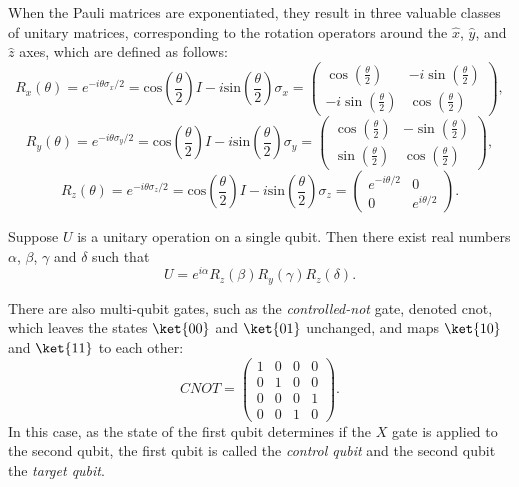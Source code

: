 When the Pauli matrices are exponentiated, they result in three valuable classes of unitary matrices, corresponding to the rotation operators around the $\hat{x}$, $\hat{y}$, and $\hat{z}$ axes, which are defined as follows:
\begin{equation*}
  R_{x}(\theta) = e^{-i\theta \sigma_{x}/2} = \text{cos} \left(\frac{\theta}{2} \right) I -i \text{sin} \left(\frac{\theta}{2} \right) \sigma_{x} = \begin{pmatrix} \cos(\frac{\theta}{2}) & -i\sin(\frac{\theta}{2})\\ -i\sin(\frac{\theta}{2}) & \cos(\frac{\theta}{2}) \end{pmatrix},
\end{equation*}
\begin{equation*}
  R_{y}(\theta) = e^{-i\theta \sigma_{y}/2} = \text{cos} \left(\frac{\theta}{2} \right) I -i \text{sin} \left(\frac{\theta}{2} \right) \sigma_{y} = \begin{pmatrix} \cos(\frac{\theta}{2}) & -\sin(\frac{\theta}{2})\\ \sin(\frac{\theta}{2}) & \cos(\frac{\theta}{2}) \end{pmatrix},
\end{equation*}
\begin{equation*}
  R_{z}(\theta) = e^{-i\theta \sigma_{z}/2} = \text{cos} \left(\frac{\theta}{2} \right) I -i \text{sin} \left(\frac{\theta}{2} \right) \sigma_{z} = \begin{pmatrix} e^{-i\theta/2} & 0\\ 0 & e^{i\theta/2} \end{pmatrix}.
\end{equation*}

\begin{theorem} \label{unitary} \cite{nielsen2010quantum}
  Suppose $U$ is a unitary operation on a single qubit. Then there exist real numbers $\alpha$, $\beta$, $\gamma$ and $\delta$ such that
  \begin{equation*}
    U = e^{i\alpha} R_{z}(\beta) R_{y}(\gamma) R_{z}(\delta).
  \end{equation*}
\end{theorem}

There are also multi-qubit gates, such as the \emph{controlled-not} gate, denoted \gls{cnot}, which leaves the states $\ket{00}$ and  $\ket{01}$ unchanged, and maps $\ket{10}$ and $\ket{11}$ to each other:
\begin{equation*}
  \textit{CNOT} = \begin{pmatrix} 1 & 0 & 0 & 0\\ 0 & 1 & 0 & 0\\ 0 & 0 & 0 & 1\\ 0 & 0 & 1 & 0 \end{pmatrix}.
\end{equation*}
In this case, as the state of the first qubit determines if the $X$ gate is applied to the second qubit, the first qubit is called the \emph{control qubit} and the second qubit the \emph{target qubit}. 

